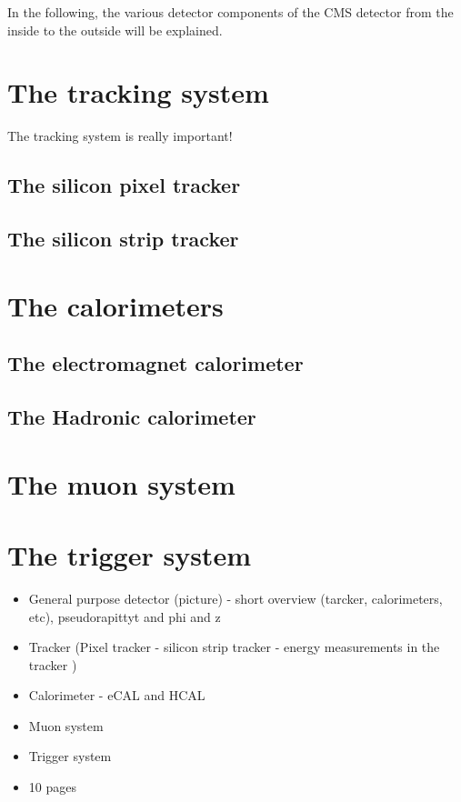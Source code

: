 In the following, the various detector components of the CMS detector from the inside to the outside will be explained.

\FloatBarrier
\section{The tracking system}
The tracking system is really important!
\subsection*{The silicon pixel tracker}
\subsection*{The silicon strip tracker}

\section{The calorimeters}
\subsection*{The electromagnet calorimeter}
\subsection*{The Hadronic calorimeter}

\section{The muon system}

\section{The trigger system}

\begin{itemize}
\item General purpose detector (picture) - short overview (tarcker, calorimeters, etc), pseudorapittyt and phi and z
\item Tracker (Pixel tracker - silicon strip tracker - energy measurements in the tracker )
\item Calorimeter - eCAL and HCAL
\item Muon system
\item Trigger system
\item 10 pages
\end{itemize}

